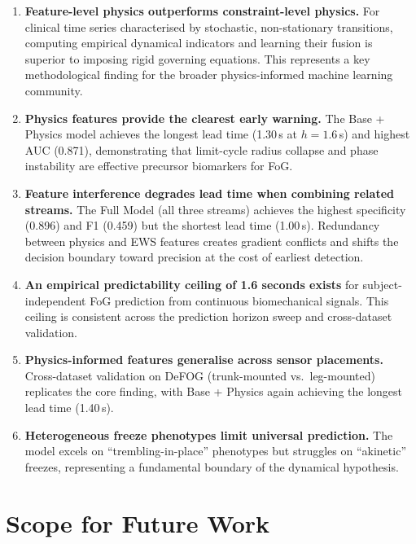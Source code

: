 \documentclass[12pt,a4paper,oneside]{report}
\numberwithin{equation}{chapter}
\numberwithin{figure}{chapter}
\numberwithin{table}{chapter}
\begin{document}
\begin{enumerate}[leftmargin=*, itemsep=5pt]
  \item \textbf{Feature-level physics outperforms constraint-level physics.} For clinical time series characterised by stochastic, non-stationary transitions, computing empirical dynamical indicators and learning their fusion is superior to imposing rigid governing equations. This represents a key methodological finding for the broader physics-informed machine learning community.

  \item \textbf{Physics features provide the clearest early warning.} The Base + Physics model achieves the longest lead time (1.30\,s at $h = 1.6$\,s) and highest AUC (0.871), demonstrating that limit-cycle radius collapse and phase instability are effective precursor biomarkers for FoG.

  \item \textbf{Feature interference degrades lead time when combining related streams.} The Full Model (all three streams) achieves the highest specificity (0.896) and F1 (0.459) but the shortest lead time (1.00\,s). Redundancy between physics and EWS features creates gradient conflicts and shifts the decision boundary toward precision at the cost of earliest detection.

  \item \textbf{An empirical predictability ceiling of 1.6 seconds exists} for subject-independent FoG prediction from continuous biomechanical signals. This ceiling is consistent across the prediction horizon sweep and cross-dataset validation.

  \item \textbf{Physics-informed features generalise across sensor placements.} Cross-dataset validation on DeFOG (trunk-mounted vs.\ leg-mounted) replicates the core finding, with Base + Physics again achieving the longest lead time (1.40\,s).

  \item \textbf{Heterogeneous freeze phenotypes limit universal prediction.} The model excels on ``trembling-in-place'' phenotypes but struggles on ``akinetic'' freezes, representing a fundamental boundary of the dynamical hypothesis.
\end{enumerate}

\section{Scope for Future Work}
\end{document}
